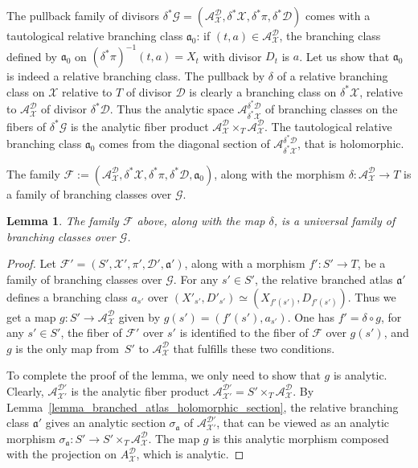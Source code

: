 \documentclass[JEP,XML,SOM,Unicode,NoEqCountersInSection,published]{cedram}
\theoremstyle{definition}
\theoremstyle{plain}
\newtheorem{lemma}[definition]{Lemma}
\begin{document}
The pullback family of divisors $\delta^*\mathcal G = \left(\mathcal A_{\mathcal X}^{\mathcal D}, \delta^*\mathcal X, \delta^* \pi, \delta^* \mathcal D\right)$ comes with a tautological relative branching class $\mathfrak a_0$: if $(t, a) \in \mathcal A_{\mathcal X}^{\mathcal D}$, the branching class defined by $\mathfrak a_0$ on $\left(\delta^*\pi\right)^{-1}(t, a) = X_t$ with divisor $D_t$ is $a$.
Let us show that $\mathfrak a_0$ is indeed a relative branching class.
The pullback by $\delta$ of a relative branching class on $\mathcal X$ relative to $T$ of divisor $\mathcal D$ is clearly a branching class on $\delta^* \mathcal X$, relative to $\mathcal A_{\mathcal X}^{\mathcal D}$ of divisor $\delta^* \mathcal D$.
Thus the analytic space $\mathcal A_{\delta^* \mathcal X}^{\delta^*\mathcal D}$ of branching classes on the fibers of $\delta^* \mathcal G$ is the analytic fiber product $\mathcal A_{\mathcal X}^{\mathcal D} \times_T \mathcal A_{\mathcal X}^{\mathcal D}$.
The tautological relative branching class $\mathfrak a_0$ comes from the diagonal section of $\mathcal A_{\delta^* \mathcal X}^{\delta^*\mathcal D}$, that is holomorphic.

The family $\mathcal F:= \left(\mathcal A_{\mathcal X}^{\mathcal D}, \delta^*\mathcal X, \delta^* \pi, \delta^* \mathcal D, \mathfrak a_0\right)$, along with the morphism $\delta: \mathcal A_{\mathcal X}^{\mathcal D} \to T$ is a family of branching classes over $\mathcal G$.

\begin{lemma}\label{lemma_univ_family_bc}
The family $\mathcal F$ above, along with the map $\delta$, is a universal family of branching classes over $\mathcal G$.
\end{lemma}

\begin{proof}
Let $\mathcal F' = (S', \mathcal X', \pi', \mathcal D', \mathfrak a')$, along with a morphism $f': S' \to T$, be a family of branching classes over $\mathcal G$. For any $s' \in S'$, the relative branched atlas $\mathfrak a'$ defines a branching class $a_{s'}$ over $\left(X'_{s'}, D'_{s'}\right) \simeq \left(X_{f'(s')}, D_{f'(s')}\right)$.
Thus we get a map $g: S' \to \mathcal A_{\mathcal X}^{\mathcal D}$ given by $g(s') = (f'(s'), a_{s'})$.
One has $f' = \delta \circ g$, for any $s' \in S'$, the fiber of $\mathcal F'$ over $s'$ is identified to the fiber of $\mathcal F$ over $g(s')$, and $g$ is the only map from~$S'$ to $\mathcal A_{\mathcal X}^{\mathcal D}$ that fulfills these two conditions.

To complete the proof of the lemma, we only need to show that $g$ is analytic.
Clearly, $\mathcal A_{\mathcal X'}^{\mathcal D'}$ is the analytic fiber product $\mathcal A_{\mathcal X'}^{\mathcal D'} = S' \times_T \mathcal A_{\mathcal X}^{\mathcal D}$.
By Lemma~\ref{lemma_branched_atlas_holomorphic_section}, the relative branching class $\mathfrak a'$ gives an analytic section $\sigma_{\mathfrak a}$ of $\mathcal A_{\mathcal X'}^{\mathcal D'}$, that can be viewed as an analytic morphism $\sigma_{\mathfrak a}: S' \to S' \times_T \mathcal A_{\mathcal X}^{\mathcal D}$.
The map $g$ is this analytic morphism composed with the projection on $A_{\mathcal X}^{\mathcal D}$, which is analytic.
\end{proof}
\end{document}
